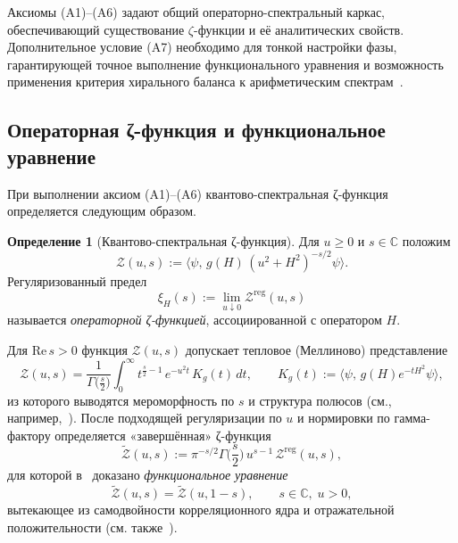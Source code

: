 \documentclass{article}
\numberwithin{equation}{section}
\theoremstyle{plain}
\theoremstyle{definition}
\newtheorem{definition}{Определение}
\theoremstyle{remark}
\def\infty{∞}\def\partial{∂}\def\sum{Σ}\def\int{∫}%
\begin{document}
\noindent
Аксиомы (A1)–(A6) задают общий операторно-спектральный каркас, обеспечивающий существование $\zeta$-функции и 
её аналитических свойств. Дополнительное условие (A7) необходимо для тонкой настройки фазы, гарантирующей 
точное выполнение функционального уравнения и возможность применения критерия хирального баланса к арифметическим спектрам~\cite{Monakhov-QSG-002}.
\subsection{Операторная ζ-функция и функциональное уравнение}
\label{subsec:qssc-zeta-fe}

\noindent
При выполнении аксиом (A1)–(A6) квантово-спектральная ζ-функция определяется
следующим образом.

\begin{definition}[Квантово-спектральная ζ-функция]
\label{def:qssc-zeta}
Для $u\ge 0$ и $s\in\mathbb C$ положим
\begin{equation}
\label{eq:qssc-zeta-def}
\mathcal Z(u,s)
:=
\big\langle \psi,\,
g(H)\,(u^2+H^2)^{-s/2}\psi\big\rangle.
\end{equation}
Регуляризованный предел
\begin{equation}
\label{eq:qssc-xi-def}
\xi_H(s)
:=
\lim_{u\downarrow0}\mathcal Z^{\mathrm{reg}}(u,s)
\end{equation}
называется \emph{операторной ζ-функцией}, ассоциированной с оператором $H$.
\end{definition}

\noindent
Для $\mathrm{Re}\,s>0$ функция $\mathcal Z(u,s)$ допускает тепловое
(Меллиново) представление
\begin{equation}
\label{eq:qssc-heat-rep}
\mathcal Z(u,s)
=
\frac{1}{\Gamma\!\big(\frac s2\big)}
\int_0^\infty
t^{\frac s2-1}\,e^{-u^2 t}\,
K_g(t)\,dt,
\qquad
K_g(t)
:=
\big\langle \psi,\,g(H)e^{-tH^2}\psi\big\rangle,
\end{equation}
из которого выводятся мероморфность по $s$ и структура полюсов
(см., например,~\cite{Seeley1967,Connes1994,Monakhov-QSG-002}). После
подходящей регуляризации по $u$ и нормировки по гамма-фактору
определяется «завершённая» ζ-функция
\begin{equation}
\label{eq:qssc-Z-tilde-def}
\widetilde{\mathcal Z}(u,s)
:=
\pi^{-s/2}\Gamma\!\Big(\frac s2\Big)\,u^{s-1}\,
\mathcal Z^{\mathrm{reg}}(u,s),
\end{equation}
для которой в~\cite{Monakhov-QSG-002} доказано \emph{функциональное уравнение}
\begin{equation}
\label{eq:qssc-FE}
\widetilde{\mathcal Z}(u,s)
=
\widetilde{\mathcal Z}(u,1-s),
\qquad
s\in\mathbb C,\;u>0,
\end{equation}
вытекающее из самодвойности корреляционного ядра и отражательной
положительности (см. также~\cite{OsterwalderSchrader1973,Terras2013}).
\end{document}
